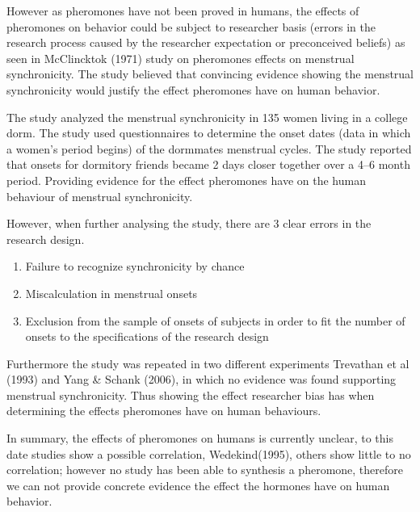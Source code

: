 \documentclass{article}
\begin{document}
However as pheromones have not been proved in humans, the effects of pheromones on behavior could be subject to researcher basis (errors in the research process caused by the researcher expectation or preconceived beliefs) as seen in McClincktok (1971) study on pheromones effects on menstrual synchronicity. The study believed that convincing evidence showing the menstrual synchronicity would justify the effect pheromones have on human behavior. 

The study analyzed the menstrual synchronicity in 135 women living in a college dorm. The study used questionnaires to determine the onset dates (data in which a women's period begins) of the dormmates menstrual cycles. The study reported that onsets for dormitory friends became 2 days closer together over a 4–6 month period. Providing evidence for the effect pheromones have on the human behaviour of menstrual synchronicity. 

However, when further analysing the study, there are 3 clear errors in the research design. 

\begin{enumerate}
    \item Failure to recognize synchronicity by chance
    \item Miscalculation in menstrual onsets
    \item Exclusion from the sample of onsets of subjects in order to fit the number of onsets to the specifications of the research design
\end{enumerate}

Furthermore the study was repeated in two different experiments Trevathan et al (1993) and Yang & Schank (2006), in which no evidence was found supporting menstrual synchronicity. Thus showing the effect researcher bias has when determining the effects pheromones have on human behaviours.

In summary, the effects of pheromones on humans is currently unclear, to this date studies show a possible correlation, Wedekind(1995), others show little to no correlation; however no study has been able to synthesis a pheromone, therefore we can not provide concrete evidence the effect the hormones have on human behavior.
\end{document}
